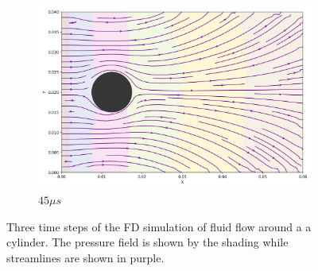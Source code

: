 \begin{figure}[!ht]
\begin{subfigure}{.3\textwidth}
        \includegraphics[width=\linewidth]{Figures/cylinder_example_timesteps/streamline09.png}
        \caption{$45 \mu s$}
        \label{fig:sub3}
    \end{subfigure}
    \caption{Three time steps of the FD simulation of fluid flow around a a cylinder. The pressure field is shown by the shading while streamlines are shown in purple.}
    \label{fig:fluid_flow_cylinder_ns_fdm}
\end{figure}

